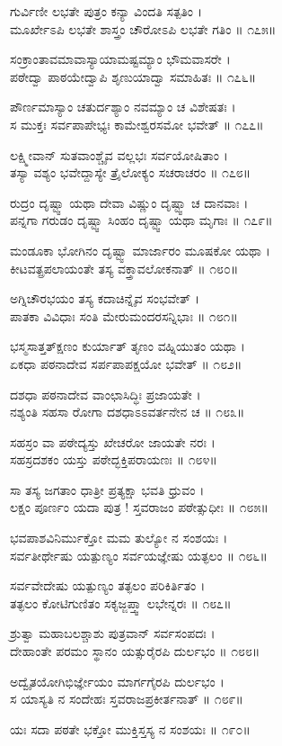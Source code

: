 ಗುರ್ವಿಣೀ ಲಭತೇ ಪುತ್ರಂ ಕನ್ಯಾ ವಿಂದತಿ ಸತ್ಪತಿಂ ।\\
ಮೂರ್ಖೇಽಪಿ ಲಭತೇ ಶಾಸ್ತ್ರಂ ಚೌರೋಽಪಿ ಲಭತೇ ಗತಿಂ ॥ ೧೭೫॥

ಸಂಕ್ರಾಂತಾವಮಾವಾಸ್ಯಾಯಾಮಷ್ಟಮ್ಯಾಂ ಭೌಮವಾಸರೇ ।\\
ಪಠೇದ್ವಾ ಪಾಠಯೇದ್ವಾಪಿ ಶೃಣುಯಾದ್ವಾ ಸಮಾಹಿತಃ ॥ ೧೭೬॥

ಪೌರ್ಣಮಾಸ್ಯಾಂ ಚತುರ್ದಶ್ಯಾಂ ನವಮ್ಯಾಂ ಚ ವಿಶೇಷತಃ ।\\
ಸ ಮುಕ್ತಃ ಸರ್ವಪಾಪೇಭ್ಯಃ ಕಾಮೇಶ್ವರಸಮೋ ಭವೇತ್ ॥ ೧೭೭॥

ಲಕ್ಷ್ಮೀವಾನ್ ಸುತವಾಂಶ್ಚೈವ ವಲ್ಲಭಃ ಸರ್ವಯೋಷಿತಾಂ ।\\
ತಸ್ಯಾ ವಶ್ಯಂ ಭವೇದ್ದಾಸ್ಯೇ ತ್ರೈಲೋಕ್ಯಂ ಸಚರಾಚರಂ ॥ ೧೭೮॥

ರುದ್ರಂ ದೃಷ್ಟ್ವಾ ಯಥಾ ದೇವಾ ವಿಷ್ಣುಂ ದೃಷ್ಟ್ವಾ ಚ ದಾನವಾಃ ।\\
ಪನ್ನಗಾ ಗರುಡಂ ದೃಷ್ಟ್ವಾ ಸಿಂಹಂ ದೃಷ್ಟ್ವಾ ಯಥಾ ಮೃಗಾಃ ॥ ೧೭೯॥

ಮಂಡೂಕಾ ಭೋಗಿನಂ ದೃಷ್ಟ್ವಾ ಮಾರ್ಜಾರಂ ಮೂಷಕೋ ಯಥಾ ।\\
ಕೀಟವತ್ಪ್ರಪಲಾಯಂತೇ ತಸ್ಯ ವಕ್ತ್ರಾವಲೋಕನಾತ್ ॥ ೧೮೦॥

ಅಗ್ನಿಚೌರಭಯಂ ತಸ್ಯ ಕದಾಚಿನ್ನೈವ ಸಂಭವೇತ್ ।\\
ಪಾತಕಾ ವಿವಿಧಾಃ ಸಂತಿ ಮೇರುಮಂದರಸನ್ನಿಭಾಃ ॥ ೧೮೧॥

ಭಸ್ಮಸಾತ್ತತ್ಕ್ಷಣಂ ಕುರ್ಯಾತ್ ತೃಣಂ ವಹ್ನಿಯುತಂ ಯಥಾ ।\\
ಏಕಧಾ ಪಠನಾದೇವ ಸರ್ಪಪಾಪಕ್ಷಯೋ ಭವೇತ್ ॥ ೧೮೨॥

ದಶಧಾ ಪಠನಾದೇವ ವಾಂಛಾಸಿದ್ಧಿಃ ಪ್ರಜಾಯತೇ ।\\
ನಶ್ಯಂತಿ ಸಹಸಾ ರೋಗಾ ದಶಧಾಽಽವರ್ತನೇನ ಚ ॥ ೧೮೩॥

ಸಹಸ್ರಂ ವಾ ಪಠೇದ್ಯಸ್ತು ಖೇಚರೋ ಜಾಯತೇ ನರಃ ।\\
ಸಹಸ್ರದಶಕಂ ಯಸ್ತು ಪಠೇದ್ಭಕ್ತಿಪರಾಯಣಃ ॥ ೧೮೪॥

ಸಾ ತಸ್ಯ ಜಗತಾಂ ಧಾತ್ರೀ ಪ್ರತ್ಯಕ್ಷಾ ಭವತಿ ಧ್ರುವಂ ।\\
ಲಕ್ಷಂ ಪೂರ್ಣಂ ಯದಾ ಪುತ್ರ ! ಸ್ತವರಾಜಂ ಪಠೇತ್ಸುಧೀಃ ॥ ೧೮೫॥

ಭವಪಾಶವಿನಿರ್ಮುಕ್ತೋ ಮಮ ತುಲ್ಯೋ ನ ಸಂಶಯಃ ।\\
ಸರ್ವತೀರ್ಥೇಷು ಯತ್ಪುಣ್ಯಂ ಸರ್ವಯಜ್ಞೇಷು ಯತ್ಫಲಂ ॥ ೧೮೬॥

ಸರ್ವವೇದೇಷು ಯತ್ಪುಣ್ಯಂ ತತ್ಫಲಂ ಪರಿಕಿರ್ತಿತಂ ।\\
ತತ್ಫಲಂ ಕೋಟಿಗುಣಿತಂ ಸಕೃಜ್ಜಪ್ತ್ವಾ ಲಭೇನ್ನರಃ ॥ ೧೮೭॥

ಶ್ರುತ್ವಾ ಮಹಾಬಲಶ್ಚಾಶು ಪುತ್ರವಾನ್ ಸರ್ವಸಂಪದಃ ।\\
ದೇಹಾಂತೇ ಪರಮಂ ಸ್ಥಾನಂ ಯತ್ಸುರೈರಪಿ ದುರ್ಲಭಂ ॥ ೧೮೮॥

ಅದ್ವೈತಯೋಗಿಭಿರ್ಜ್ಞೇಯಂ ಮಾರ್ಗಗೈರಪಿ ದುರ್ಲಭಂ ।\\
ಸ ಯಾಸ್ಯತಿ ನ ಸಂದೇಹಃ ಸ್ತವರಾಜಪ್ರಕೀರ್ತನಾತ್ ॥ ೧೮೯॥

ಯಃ ಸದಾ ಪಠತೇ ಭಕ್ತೋ ಮುಕ್ತಿಸ್ತಸ್ಯ ನ ಸಂಶಯಃ ॥ ೧೯೦॥


